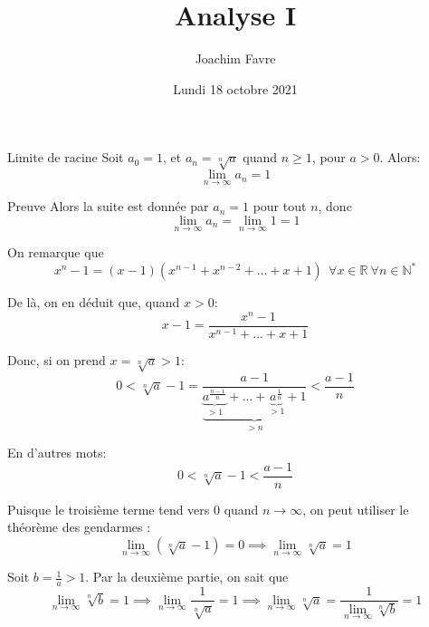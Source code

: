 \documentclass[a4paper]{article}
\title{Analyse I}
\author{Joachim Favre}
\date{Lundi 18 octobre 2021}
\begin{document}
\maketitle


\begin{parag}{Limite de racine}
    Soit $a_0 = 1$, et $a_n = \sqrt[n]{a}$ quand $n \geq 1$, pour $a > 0$. Alors: 
    \[\lim_{n \to \infty} a_n = 1\]

    \begin{subparag}{Preuve}
         Alors la suite est donnée par $a_n = 1$ pour tout $n$, donc 
        \[\lim_{n \to \infty} a_n = \lim_{n \to \infty} 1 = 1\]
        
        \vspace{1em}
         On remarque que 
        \[x^{n} - 1 = \left(x - 1\right)\left(x^{n-1} + x^{n-2} + \ldots + x + 1\right) \ \ \forall x \in \mathbb{R}\ \forall n \in \mathbb{N}^*\]

        De là, on en déduit que, quand $x > 0$: 
        \[x - 1 = \frac{x^{n} - 1}{x^{n-1} + \ldots + x + 1}\]

        Donc, si on prend $x = \sqrt[n]{a} > 1$: 
        \[0 < \sqrt[n]{a} - 1 = \frac{a - 1}{\underbrace{\underbrace{a^{\frac{n-1}{n}}}_{>1} + \ldots + \underbrace{a^{\frac{1}{n}}}_{>1} + 1}_{>n}} < \frac{a - 1}{n}\]
        
        En d'autres mots: 
        \[0 < \sqrt[n]{a} - 1 < \frac{a - 1}{n}\]
        
        Puisque le troisième terme tend vers 0 quand $n \to \infty$, on peut utiliser le théorème des gendarmes :       
        \[\lim_{n \to \infty} \left(\sqrt[n]{a} - 1\right) = 0 \implies \lim_{n \to \infty} \sqrt[n]{a} = 1\]
        
        \vspace{1em}
         Soit $b = \frac{1}{a} > 1$. Par la deuxième partie, on sait que 
        \[\lim_{n \to \infty} \sqrt[n]{b} = 1 \implies \lim_{n \to \infty} \frac{1}{\sqrt[n]{a}} = 1 \implies \lim_{n \to \infty} \sqrt[n]{a} =  \frac{1}{\lim\limits_{n \to \infty} \sqrt[n]{b}} = 1\]
        
    \end{subparag}
\end{parag}
\end{document}
